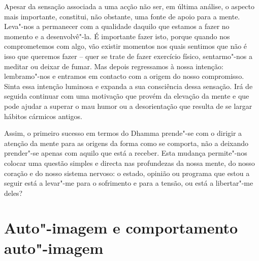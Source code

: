 Apesar da sensação associada a uma acção não ser, em última análise, o aspecto mais importante, constitui, não obstante, uma fonte de apoio para a mente. Leva"-nos a permanecer com a qualidade daquilo que estamos a fazer no momento e a desenvolvê"-la. É importante fazer isto, porque quando nos comprometemos com algo, vão existir momentos nos quais sentimos que não é isso que queremos fazer -- quer se trate de fazer exercício físico, sentarmo"-nos a meditar ou deixar de fumar. Mas depois regressamos à nossa intenção: lembramo"-nos e entramos em contacto com a origem do nosso compromisso. Sinta essa intenção luminosa e expanda a sua consciência dessa sensação. Irá de seguida continuar com uma motivação que provém da elevação da mente e que pode ajudar a superar o mau humor ou a desorientação que resulta de se largar hábitos cármicos antigos.

Assim, o primeiro sucesso em termos do Dhamma prende"-se com o dirigir a atenção da mente para as origens da forma como se comporta, não a deixando prender"-se apenas com aquilo que está a receber. Esta mudança permite"-nos colocar uma questão simples e directa nas profundezas da nossa mente, do nosso coração e do nosso sistema nervoso: o estado, opinião ou programa que estou a seguir está a levar"-me para o sofrimento e para a tensão, ou está a libertar"-me deles?

\section{Auto"-imagem e comportamento auto"-imagem}

